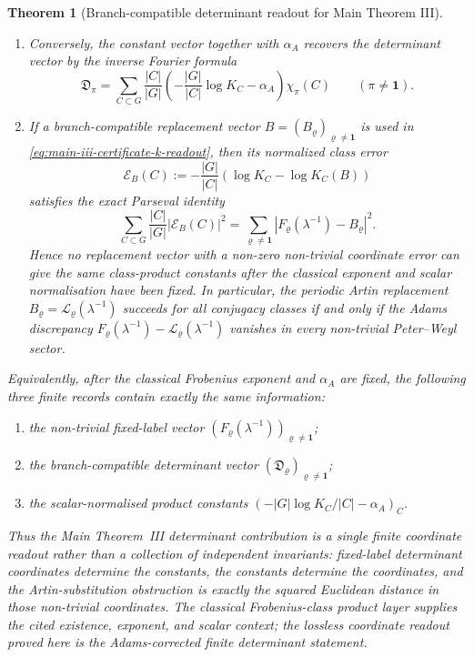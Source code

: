 \documentclass[11pt,a4paper]{amsart}
\theoremstyle{plain}
\newtheorem{theorem}{Theorem}[section]
\theoremstyle{definition}
\theoremstyle{remark}
\begin{document}
\begin{theorem}[Branch-compatible determinant readout for Main Theorem III]
\begin{enumerate}[label=\textup{(\alph*)},leftmargin=*]
    \item Conversely, the constant vector together with \(\alpha_A\) recovers
    the determinant vector by the inverse Fourier formula
    \begin{equation}\label{eq:main-iii-certificate-inverse-readout}
      \mathfrak D_\pi
      =
      \sum_{C\subset G}\frac{|C|}{|G|}
      \left(-\frac{|G|}{|C|}\log K_C-\alpha_A\right)
      \chi_\pi(C)
      \qquad(\pi\neq\mathbf1).
    \end{equation}
    \item If a branch-compatible replacement vector
    \(B=(B_\varrho)_{\varrho\neq\mathbf1}\) is used in
    \eqref{eq:main-iii-certificate-k-readout}, then its normalized class error
    \[
      \mathscr E_B(C)
      :=
      -\frac{|G|}{|C|}
      \left(\log K_C-\log K_C(B)\right)
    \]
    satisfies the exact Parseval identity
    \begin{equation}\label{eq:main-iii-certificate-parseval}
      \sum_{C\subset G}\frac{|C|}{|G|}|\mathscr E_B(C)|^2
      =
      \sum_{\varrho\neq\mathbf1}
        |F_\varrho(\lambda^{-1})-B_\varrho|^2 .
    \end{equation}
    Hence no replacement vector with a non-zero non-trivial coordinate error can
    give the same class-product constants after the classical exponent and
    scalar normalisation have been fixed.  In particular, the periodic Artin
    replacement \(B_\varrho=\mathcal L_\varrho(\lambda^{-1})\) succeeds for all
    conjugacy classes if and only if the Adams discrepancy
    \(F_\varrho(\lambda^{-1})-\mathcal L_\varrho(\lambda^{-1})\) vanishes in
    every non-trivial Peter--Weyl sector.
  \end{enumerate}
  Equivalently, after the classical Frobenius exponent and \(\alpha_A\) are
  fixed, the following three finite records contain exactly the same
  information:
  \begin{enumerate}[label=\textup{(\roman*)},leftmargin=*]
    \item the non-trivial fixed-label vector
      \((F_\varrho(\lambda^{-1}))_{\varrho\neq\mathbf1}\);
    \item the branch-compatible determinant vector
      \((\mathfrak D_\varrho)_{\varrho\neq\mathbf1}\);
    \item the scalar-normalised product constants
      \((-|G|\log K_C/|C|-\alpha_A)_C\).
  \end{enumerate}
  Thus the Main Theorem~III determinant contribution is a single finite
  coordinate readout rather than a collection of independent invariants: fixed-label determinant coordinates
  determine the constants, the constants determine the coordinates, and the
  Artin-substitution obstruction is exactly the squared Euclidean distance in
  those non-trivial coordinates.  The classical Frobenius-class product layer
  supplies the cited existence, exponent, and scalar context; the lossless
  coordinate readout proved here is the Adams-corrected finite determinant
  statement.
\end{theorem}
\end{document}

